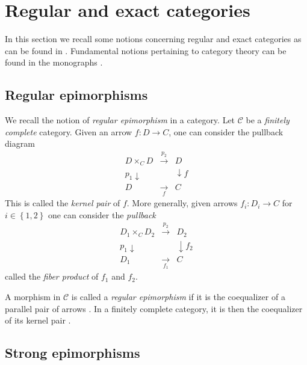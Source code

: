\documentclass[12pt]{amsart}
\theoremstyle{definition}
\begin{document}
\section{Regular and exact categories\label{Section:regular}}

In this section we recall some notions concerning regular and exact
categories as can be found in \cite%
{barr_exact_1971,gran_introduction_2021,carboni_regular_1998,shulman_exact_2012}%
. Fundamental notions pertaining to category theory can be found in the
monographs \cite%
{awodey_category_2006,mac_lane_categories_1998,leinster_basic_2014}.

\subsection{Regular epimorphisms}

We recall the notion of \emph{regular epimorphism} in a category. Let $%
\mathcal{C}$ be a \emph{finitely complete} category. Given an arrow $%
f:D\rightarrow C$, one can consider the pullback diagram 
\begin{equation*}
\begin{array}{ccc}
D\times _{C}D & \overset{p_{2}}{\rightarrow } & D \\ 
p_{1}\downarrow &  & \downarrow f \\ 
D & \underset{f}{\rightarrow } & C%
\end{array}%
\end{equation*}%
This is called the \emph{kernel pair} of $f$. More generally, given arrows $%
f_{i}:D_{i}\rightarrow C$ for $i\in \left\{ 1,2\right\} $ one can consider
the \emph{pullback}%
\begin{equation*}
\begin{array}{ccc}
D_{1}\times _{C}D_{2} & \overset{p_{2}}{\rightarrow } & D_{2} \\ 
p_{1}\downarrow &  & \downarrow f_{2} \\ 
D_{1} & \underset{f_{1}}{\rightarrow } & C%
\end{array}%
\end{equation*}%
called the \emph{fiber product} of $f_{1}$ and $f_{2}$.

A morphism in $\mathcal{C}$ is called a \emph{regular epimorphism} if it is
the coequalizer of a parallel pair of arrows \cite[Definition~1.5]%
{gran_introduction_2021}. In a finitely complete category, it is then the
coequalizer of its kernel pair \cite[Definition~1.5]{gran_introduction_2021}.

\subsection{Strong epimorphisms}
\end{document}
